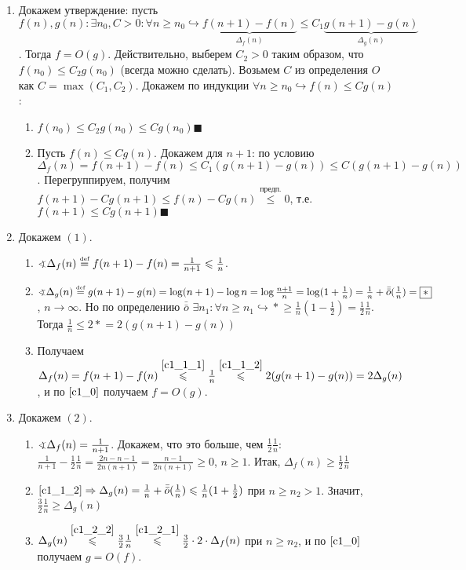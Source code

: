 \documentclass[a4paper]{article}
\def\eqdef{\overset{\mbox{\tiny def}}{=}}
\newcommand{\smallo}{\bar{\bar{o}}}
\begin{document}
\begin{enumerate}
\item \label{c1_0} Докажем утверждение: пусть $f(n),g(n)\colon \exists n_0,C>0\colon \forall n\geqslant n_0\hookrightarrow \underbrace{f(n+1)-f(n)}_{\Delta_f(n)}\leqslant C_1\underbrace{g(n+1)-g(n)}_{\Delta_g(n)}$. Тогда $f=O(g)$. Действительно, выберем $C_2>0$ таким образом, что $f(n_0)\leqslant C_2g(n_0)$ (всегда можно сделать). Возьмем $C$ из определения $O$ как $C=\max(C_1,C_2)$. Докажем по индукции $\forall n\geqslant n_0\hookrightarrow f(n)\leqslant Cg(n)$:\begin{enumerate}
\item $f(n_0)\leqslant C_2g(n_0)\leqslant Cg(n_0)\blacksquare$
\item Пусть $f(n)\leqslant Cg(n)$. Докажем для $n+1$: по условию $\Delta_f(n)=f(n+1)-f(n)\leqslant C_1(g(n+1)-g(n))\leqslant C(g(n+1)-g(n))$. Перегруппируем, получим $f(n+1)-Cg(n+1)\leqslant f(n)-Cg(n)\overset{\mbox{предп.}}{\leqslant} 0$, т.е. $f(n+1)\leqslant Cg(n+1)\blacksquare$
\end{enumerate}
\item Докажем $(1)$. \begin{enumerate}
\item \label{c1_1_1} $\varangle \Delta_f(n)\eqdef f(n+1)-f(n)=\frac{1}{n+1}\leqslant \frac{1}{n}$. 
\item \label{c1_1_2} $\varangle \Delta_g(n)\eqdef g(n+1)-g(n)=\log(n+1)-\log n=\log\frac{n+1}{n}=\log(1+\frac{1}{n})=\frac{1}{n}+\smallo(\frac{1}{n})=\boxed{*}$, $n\to\infty$. Но по определению $\smallo$ $\exists n_1\colon\forall n\geqslant n_1\hookrightarrow \boxed{*}\geqslant \frac{1}{n}(1-\frac{1}{2})=\frac{1}{2}\frac{1}{n}$. Тогда $\frac{1}{n}\leqslant 2\boxed{*}=2(g(n+1)-g(n))$
\item Получаем $\Delta_f(n)=f(n+1)-f(n)\overset{\ref{c1_1_1}}{\leqslant} \frac{1}{n}\overset{\ref{c1_1_2}}{\leqslant} 2(g(n+1)-g(n))=2\Delta_g(n)$, и по $\ref{c1_0}$ получаем $f=O(g)$.
\end{enumerate}
\item Докажем $(2)$. \begin{enumerate}
\item \label{c1_2_1} $\varangle \Delta_f(n)=\frac{1}{n+1}$. Докажем, что это больше, чем $\frac{1}{2}\frac{1}{n}$: $\frac{1}{n+1}-\frac{1}{2}\frac{1}{n}=\frac{2n-n-1}{2n(n+1)}=\frac{n-1}{2n(n+1)}\geqslant 0$, $n\geqslant 1$. Итак, $\Delta_f(n)\geqslant \frac{1}{2}\frac{1}{n}$
\item \label{c1_2_2} $\ref{c1_1_2}\Rightarrow \Delta_g(n)=\frac{1}{n}+\smallo(\frac{1}{n})\leqslant \frac{1}{n}(1+\frac{1}{2})$ при $n\geqslant n_2>1$. Значит, $\frac{3}{2}\frac{1}{n}\geqslant\Delta_g(n)$
\item $\Delta_g(n)\overset{\ref{c1_2_2}}{\leqslant}\frac{3}{2}\frac{1}{n}\overset{\ref{c1_2_1}}{\leqslant}\frac{3}{2}\cdot 2\cdot \Delta_f(n)$ при $n\geqslant n_2$, и по $\ref{c1_0}$ получаем $g=O(f)$.
\end{enumerate}
\end{enumerate}
\end{document}
